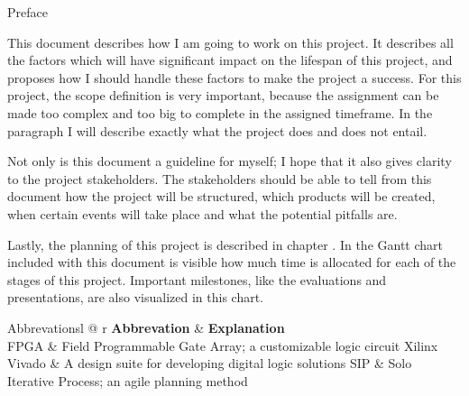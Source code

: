 \documentclass{matthijs}
\begin{document}
	\begin{hoofdstuk}{Preface}

		This document describes how I am going to work on this project.
		It describes all the factors which will have significant impact on the lifespan of this project, and proposes how I should handle these factors to make the project a success.
		For this project, the scope definition is very important, because the assignment can be made too complex and too big to complete in the assigned timeframe.
		In the paragraph  I will describe exactly what the project does and does not entail.
		
		\bigskip

		Not only is this document a guideline for myself; I hope that it also gives clarity to the project stakeholders.
		The stakeholders should be able to tell from this document how the project will be structured, which products will be created, when certain events will take place and what the potential pitfalls are.

		\bigskip

		Lastly, the planning of this project is described in chapter .
		In the Gantt chart included with this document is visible how much time is allocated for each of the stages of this project.
		Important milestones, like the evaluations and presentations, are also visualized in this chart.
		
		\vspace{16pt}

		\begin{tabel}{Abbrevations}{l @{\extracolsep{\fill}} r}
			\textbf{Abbrevation} & \textbf{Explanation} \\
			\midrule
			FPGA & Field Programmable Gate Array; a customizable logic circuit \tabularnewline
			Xilinx Vivado & A design suite for developing digital logic solutions \tabularnewline
			SIP & Solo Iterative Process; an agile planning method \tabularnewline
		\end{tabel}

	\end{hoofdstuk}
	
\end{document}
